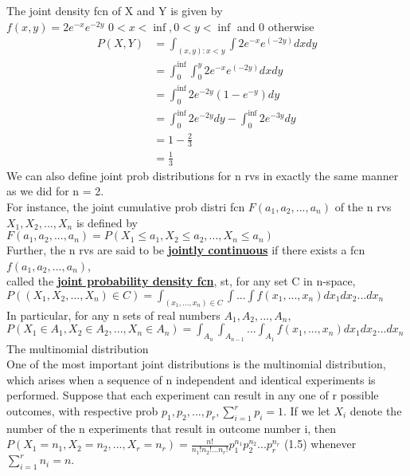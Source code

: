 \documentclass{article}
\begin{document}
The joint density fcn of X and Y is given by \\ 
$ f(x,y) = 2e^{-x}e^{-2y}$ $0< x < \inf, 0 < y < \inf$ and 0 otherwise 
\begin{align*}
P(X,Y)  &= \int_{(x,y): x < y} \int 2e^{-x}e^(-2y)dx dy \\
        &= \int_{0}^{\inf} \int_{0}^{y} 2e^{-x}e^(-2y)dx dy \\
        &= \int_{0}^{\inf} 2e^{-2y}(1-e^{-y})dy \\
        &= \int_{0}^{\inf} 2e^{-2y}dy - \int_{0}^{\inf} 2e^{-3y}dy \\
        &= 1 - \frac{2}{3} \\
        &= \frac{1}{3}
\end{align*}
We can also define joint prob distributions for n rvs in exactly the same manner as we did for n = 2. \\
For instance, the joint cumulative prob distri fcn $F(a_1, a_2, ..., a_n)$ of the n rvs $X_1, X_2, ..., X_n$ is defined by \\
$F(a_1, a_2, ..., a_n) = P(X_1 \leq a_1, X_2 \leq a_2, ..., X_n \leq a_n)$\\
Further, the n rvs are said to be \underline{\textbf{jointly continuous}} if there exists a fcn $f(a_1, a_2, ..., a_n)$, \\
called the \underline{\textbf{joint probability density fcn}}, st, for any set C in n-space, \\
$P((X_1, X_2, ..., X_n)\in C) = \int_{(x_1,...,x_n)\in C} \int ... \int f(x_1,...,x_n)dx_1 dx_2 ... dx_n $ \\ 
In particular, for any n sets of real numbers $A_1, A_2, ... ,A_n$,\\
$P(X_1 \in A_1, X_2 \in A_2, ...,X_n \in A_n) = \int_{A_n} \int_{A_{n-1}} ... \int_{A_1} f(x_1,...,x_n)dx_1 dx_2 ... dx_n $ \\ 
The multinomial distribution\\
One of the most important joint distributions is the multinomial distribution, which arises when a sequence of n independent and identical experiments is performed. Suppose that each experiment can result in any one of r possible outcomes, with respective prob $p_1, p_2, ..., p_r, \sum_{i=1}^r p_i = 1$. If we let $X_i$ denote the number of the n experiments that result in outcome number i, then \\ 
$P(X_1 = n_1, X_2 = n_2, ..., X_r = n_r) = \frac{n!}{n_1!n_2!...n_r!}p_1^{n_1}p_2^{n_2}...p_r^{n_r}$ (1.5) whenever $\sum_{i=1}^r n_i =n.$ \\
\end{document}
